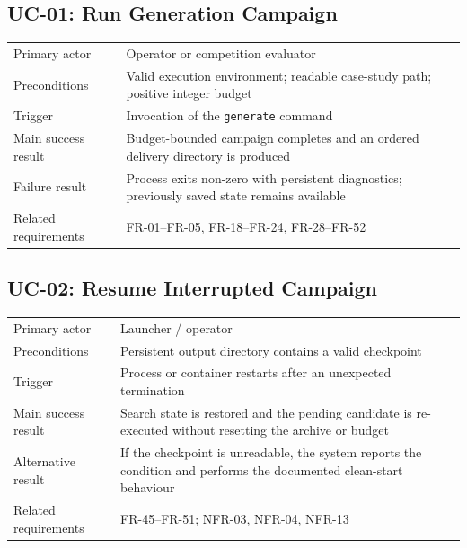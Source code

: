 \documentclass[11pt,a4paper]{report}
\begin{document}
\subsection{UC-01: Run Generation Campaign}
\begin{tabularx}{\textwidth}{L{3.4cm} Y}
\toprule
Primary actor & Operator or competition evaluator\\
Preconditions & Valid execution environment; readable case-study path; positive integer budget\\
Trigger & Invocation of the \texttt{generate} command\\
Main success result & Budget-bounded campaign completes and an ordered delivery directory is produced\\
Failure result & Process exits non-zero with persistent diagnostics; previously saved state remains available\\
Related requirements & FR-01--FR-05, FR-18--FR-24, FR-28--FR-52\\
\bottomrule
\end{tabularx}

\subsection{UC-02: Resume Interrupted Campaign}
\begin{tabularx}{\textwidth}{L{3.4cm} Y}
\toprule
Primary actor & Launcher / operator\\
Preconditions & Persistent output directory contains a valid checkpoint\\
Trigger & Process or container restarts after an unexpected termination\\
Main success result & Search state is restored and the pending candidate is re-executed without resetting the archive or budget\\
Alternative result & If the checkpoint is unreadable, the system reports the condition and performs the documented clean-start behaviour\\
Related requirements & FR-45--FR-51; NFR-03, NFR-04, NFR-13\\
\bottomrule
\end{tabularx}
\end{document}
